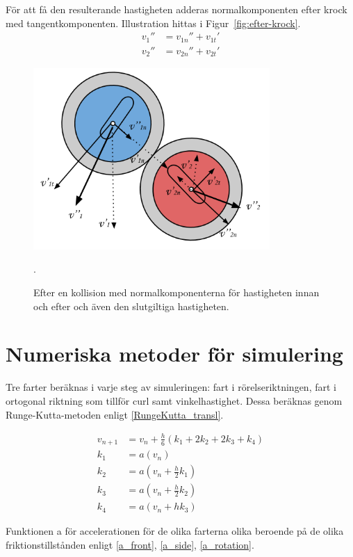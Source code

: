 \documentclass[11pt]{article} %
\begin{document}
\pagebreak

För att få den resulterande hastigheten adderas normalkomponenten efter krock med tangentkomponenten. Illustration hittas i Figur~\ref{fig:efter-krock}. 
 \begin{align}\label{vfinal}
v_1''& = v_{1n}'' + v_{1t}'\\
v_2''& = v_{2n}'' + v_{2t}'
 \end{align}

\begin{figure}[ht!]
\centering
\includegraphics[width=90mm]{efter-krock.png}
\caption{Efter en kollision med normalkomponenterna för hastigheten innan och efter och även den slutgiltiga hastigheten.  }.
\label{fig:efter-krock}
\label{overflow}
\end{figure}


\section{Numeriska metoder för simulering}
Tre farter beräknas i varje steg av simuleringen: fart i rörelseriktningen, fart i ortogonal riktning som tillför curl samt vinkelhastighet. Dessa beräknas genom Runge-Kutta-metoden enligt \eqref{RungeKutta_transl}. 

 \begin{subequations}\label{RungeKutta_transl}
 \begin{align}
 v_{n+1}& =v_n + \frac{h}{6} (k_1+2 k_2 + 2 k_3 + k_4)\\
 k_1& = a(v_n)\\
 k_2& = a(v_n + \frac{h}{2} k_1)\\
 k_3& = a(v_n + \frac{h}{2} k_2)\\
 k_4& = a(v_n + h k_3)
 \end{align}
\end{subequations}

Funktionen a för accelerationen för de olika farterna olika beroende på de olika friktionstillstånden enligt \eqref{a_front},  \eqref{a_side}, \eqref{a_rotation}.
 
\end{document}
